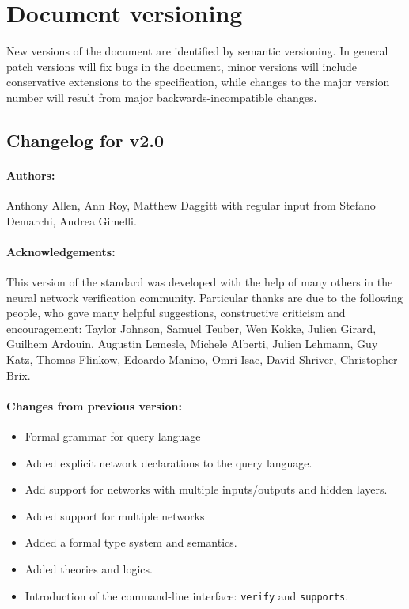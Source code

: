 \section{Document versioning}

New versions of the document are identified by semantic versioning. In general patch versions will fix bugs in the document, minor versions will include conservative extensions to the specification, while changes to the major version number will result from major backwards-incompatible changes.

\subsection*{Changelog for v2.0}

\paragraph{Authors:} Anthony Allen, Ann Roy, Matthew Daggitt with regular input from Stefano Demarchi, Andrea Gimelli.

\noindent \paragraph{Acknowledgements:} This version of the standard was developed with the help of many others in the neural network verification community.
Particular thanks are due to the following people, who gave many helpful suggestions, constructive criticism and encouragement: Taylor Johnson, Samuel Teuber, Wen Kokke, Julien Girard, Guilhem Ardouin, Augustin Lemesle, Michele Alberti, Julien Lehmann, Guy Katz, Thomas Flinkow, Edoardo Manino, Omri Isac, David Shriver, Christopher Brix.

\noindent \paragraph{Changes from previous version:}
\begin{itemize}
\item Formal grammar for query language
\item Added explicit network declarations to the query language.
\item Add support for networks with multiple inputs/outputs and hidden layers.
\item Added support for multiple networks
\item Added a formal type system and semantics.
\item Added theories and logics.
\item Introduction of the command-line interface: \texttt{verify} and \texttt{supports}.
\end{itemize}


